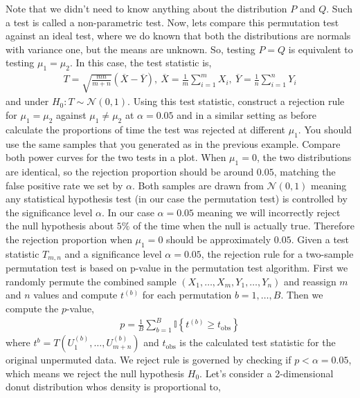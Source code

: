 \begin{solution}
\hfill\break
\hfill\break
Note that we didn't need to know anything about the distribution $P$ and $Q$. Such a test is called a non-parametric test. Now, lets compare this permutation test against an ideal test, where we do known that both the distributions are normals with variance one, but the means are unknown. So, testing $P = Q$ is equivalent to testing $\mu_1 = \mu_2$. In this case, the test statistic is,
\begin{align*}
T = \sqrt{\frac{mn}{m + n}} (\overline{X} - \overline{Y}),\ \overline{X} = \frac{1}{m}\sum_{i = 1}^{ m}X_i, \ \overline{Y} = \frac{1}{n} \sum_{i = 1}^{ n }Y_i
\end{align*}
and under $H_0: T \sim \mathcal{N}(0,1)$. Using this test statistic, construct a rejection rule for $\mu_1 = \mu_2$ against $\mu_1 \neq \mu_2$ at $\alpha = 0.05$ and in a similar setting as before calculate the proportions of time the test was rejected at different $\mu_1$. You should use the same samples that you generated as in the previous example. Compare both power curves for the two tests in a plot.
\hfill\break
\hfill\break
When $\mu_1 = 0$, the two distributions are identical, so the rejection proportion should be around $0.05$, matching the false positive rate we set by $\alpha$. Both samples are drawn from $\mathcal{N}(0,1)$ meaning any statistical hypothesis test (in our case the permutation test) is controlled by the significance level $\alpha$. In our case $\alpha = 0.05$ meaning we will incorrectly reject the null hypothesis about $5\%$ of the time when the null is actually true. Therefore the rejection proportion when $\mu_1 = 0$ should be approximately $0.05$.
\hfill\break
\hfill\break
Given a test statistic $T_{m,n}$ and a significance level $\alpha = 0.05$, the rejection rule for a two-sample permutation test is based on p-value in the permutation test algorithm. First we randomly permute the combined sample $(X_1,\dots,X_m,Y_1,\dots,Y_n)$ and reassign $m$ and $n$ values and compute $t^{(b)}$ for each permutation $b = 1,\dots,B$. Then we compute the $p$-value,
\begin{align*}
p = \frac{1}{B} \sum_{b = 1}^{ B} \mathbb{I} \left\{ t^{(b)} \geq t_{\text{obs}} \right\}
\end{align*}
where $t^{b} = T(U_1^{(b)}, \dots, U_{m+n}^{(b)})$ and $t_{\text{obs}}$ is the calculated test statistic for the original unpermuted data. We reject rule is governed by checking if $p < \alpha = 0.05$, which means we reject the null hypothesis $H_0$.
\hfill\break
\hfill\break
Let's consider a 2-dimensional donut distribution whos density is proportional to,

\end{solution}
